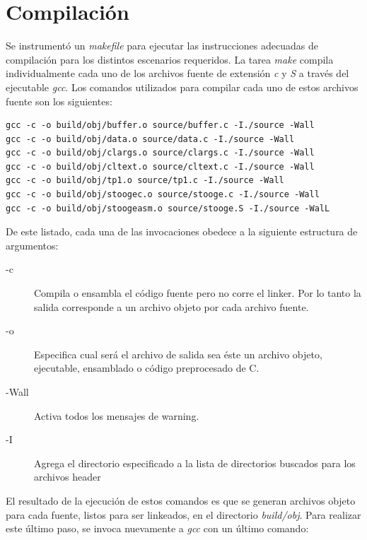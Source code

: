 \documentclass[a4paper,11pt]{article}
\begin{document}
\section{Compilación}

Se instrumentó un \textit{makefile} para ejecutar las instrucciones adecuadas
de compilación para los distintos escenarios requeridos. La
tarea \textit{make} compila individualmente cada uno de los archivos fuente de
extensión \textit{c} y \textit{S} a través del ejecutable \textit{gcc}.
Los comandos utilizados para compilar cada uno de estos archivos fuente son los
siguientes:

\begin{lstlisting}
gcc -c -o build/obj/buffer.o source/buffer.c -I./source -Wall
gcc -c -o build/obj/data.o source/data.c -I./source -Wall
gcc -c -o build/obj/clargs.o source/clargs.c -I./source -Wall
gcc -c -o build/obj/cltext.o source/cltext.c -I./source -Wall
gcc -c -o build/obj/tp1.o source/tp1.c -I./source -Wall
gcc -c -o build/obj/stoogec.o source/stooge.c -I./source -Wall
gcc -c -o build/obj/stoogeasm.o source/stooge.S -I./source -WalL
\end{lstlisting}

De este listado, cada una de las invocaciones obedece a la siguiente estructura
de argumentos:

\begin{description}

  \item[-c] Compila o ensambla el código fuente pero no corre el linker.  Por
    lo tanto la salida corresponde a un archivo objeto por cada archivo fuente.

  \item[-o] Especifica cual será el archivo de salida sea éste un archivo
    objeto, ejecutable, ensamblado o código preprocesado de C.

  \item[-Wall] Activa todos los mensajes de warning.

  \item[-I] Agrega el directorio especificado a la lista de directorios
    buscados para los archivos header

\end{description}

El resultado de la ejecución de estos comandos es que se generan archivos
objeto para cada fuente, listos para ser linkeados, en el directorio
\textit{build/obj}. Para realizar este último paso, se invoca nuevamente a
\textit{gcc} con un último comando:
\end{document}
